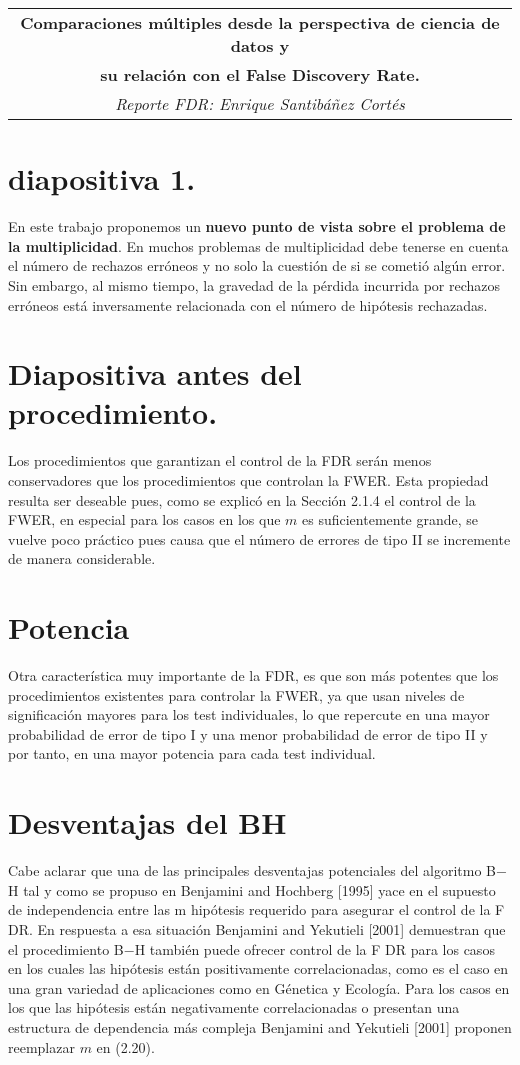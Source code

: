 \documentclass[11pt,letterpaper]{article}
\begin{document}
\begin{table}[ht]
\centering
\begin{tabular}{c}
\textbf{Comparaciones múltiples desde la perspectiva de ciencia de datos y}\\
\textbf{su relación con el False Discovery Rate.}\\
\textit{Reporte FDR: Enrique Santibáñez Cortés}
\end{tabular}
\end{table}

\section{diapositiva 1.}
En este trabajo proponemos un \textbf{nuevo punto de vista sobre el problema de la multiplicidad}. En muchos
problemas de multiplicidad debe tenerse en cuenta el número de rechazos erróneos y no solo la cuestión de
si se cometió algún error. Sin embargo, al mismo tiempo, la gravedad de la pérdida incurrida por rechazos
erróneos está inversamente relacionada con el número de hipótesis rechazadas.

\section{Diapositiva antes del procedimiento.}
Los procedimientos que garantizan el control de la FDR serán menos conservadores que los procedimientos que controlan la FWER. Esta propiedad resulta ser deseable pues, como se explicó en la Sección 2.1.4 el control de la FWER, en especial para los casos en los que $m$ es suficientemente grande, se vuelve poco práctico pues causa que el número de errores de tipo II se incremente de manera considerable.

\section{Potencia}
Otra característica muy importante de la FDR, es que son más potentes que los procedimientos existentes para controlar la FWER, ya que usan niveles de significación mayores para los test individuales, lo que repercute en una mayor probabilidad de error de tipo I y una menor probabilidad de error de tipo II y por tanto, en una mayor potencia para cada test individual.

\section{Desventajas del BH}
Cabe aclarar que una de las principales desventajas potenciales del algoritmo B$-$H tal y como se
propuso en Benjamini and Hochberg [1995] yace en el supuesto de independencia entre las m hipótesis
requerido para asegurar el control de la F DR. En respuesta a esa situación Benjamini and Yekutieli
[2001] demuestran que el procedimiento B$-$H también puede ofrecer control de la F DR para los casos
en los cuales las hipótesis están positivamente correlacionadas, como es el caso en una gran variedad de aplicaciones como en Génetica y Ecología. Para los casos en los que las hipótesis están negativamente
correlacionadas o presentan una estructura de dependencia más compleja Benjamini and Yekutieli [2001]
proponen reemplazar $m$ en (2.20).
\end{document}
